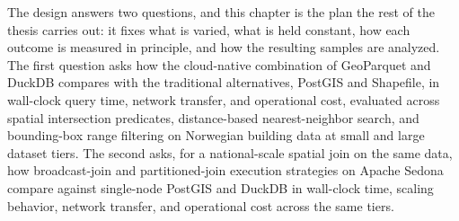 
The design answers two questions, and this chapter is the plan the rest of the thesis carries out: it fixes what is varied, what is held constant, how each outcome is measured in principle, and how the resulting samples are analyzed. The first question asks how the cloud-native combination of GeoParquet and DuckDB compares with the traditional alternatives, PostGIS and Shapefile, in wall-clock query time, network transfer, and operational cost, evaluated across spatial intersection predicates, distance-based nearest-neighbor search, and bounding-box range filtering on Norwegian building data at small and large dataset tiers. The second asks, for a national-scale spatial join on the same data, how broadcast-join and partitioned-join execution strategies on Apache Sedona compare against single-node PostGIS and DuckDB in wall-clock time, scaling behavior, network transfer, and operational cost across the same tiers.





